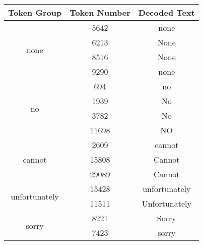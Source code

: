 \subsection{}
\label{sec:decoded_token_group}


\begin{table}[h]
    \centering
    \begin{tabular}{ccc}
        \toprule
        \textbf{Token Group} & \textbf{Token Number} & \textbf{Decoded Text} \\ \midrule
        \multirow{4}{*}{none} & 5642 & none \\ 
        & 6213 & None \\
        & 8516 & None \\
        & 9290 & none \\ \midrule
        \multirow{4}{*}{no} & 694 & no \\ 
        & 1939 & No \\ 
        & 3782 & No \\ 
        & 11698 & NO \\ \midrule
        \multirow{3}{*}{cannot} & 2609 & cannot \\ 
        & 15808 & Cannot \\ 
        & 29089 & Cannot \\ \midrule
        \multirow{2}{*}{unfortunately} & 15428 & unfortunately \\ 
        & 11511 & Unfortunately \\ \midrule
        \multirow{2}{*}{sorry} & 8221 & Sorry \\ 
        & 7423 & sorry \\ \bottomrule
    \end{tabular}
    \caption{}
    \label{tab:token_group}
\end{table}

\clearpage